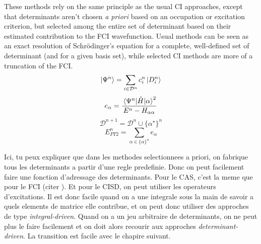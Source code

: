 \documentclass[./thesis.tex]{subfiles}
\begin{document}
These methods rely on the same principle as the usual CI approaches, except that determinants aren't chosen \textit{a priori} based on an occupation or excitation criterion, but selected among the entire set of determinant based on their estimated contribution to the FCI wavefunction. Usual methods can be seen as an exact resolution of Schrödinger's equation for a complete, well-defined set of determinant (and for a given basis set), while selected CI methods are more of a truncation of the FCI.
\begin{equation}
\ket{\Psi^{n}} = \sum_{i \in \mathcal{D}^n} c_i^{n} \ket{D^n_i}
\end{equation}
\begin{equation}
e_\alpha = \frac{\mel{\Psi^n}{\hat{H}}{\alpha}^2}{E^n - H_{\alpha \alpha}}
\end{equation}
\begin{equation}
\mathcal{D}^{n+1} = \mathcal{D}^{n} \cup \{ \alpha^\star \}^n
\end{equation}
\begin{equation}
E_{PT2}^n = \sum_{\alpha \in \{\alpha \}^n} e_\alpha
\end{equation}

\alert{Ici, tu peux expliquer que dans les methodes selectionnees a priori, on
fabrique tous les determinants a partir d'une regle predefinie. Donc on peut
facilement faire une fonction d'adressage des determinants. Pour le CAS, c'est
la meme que pour le FCI (citer \cite{Knowles_1984}). Et pour le CISD, on peut
utiliser les operateurs d'excitations. Il est donc facile quand on a une
integrale sous la main de savoir a quels elements de matrice elle contribue, et
on peut donc utiliser des approches de type \emph{integral-driven}. Quand on a
un jeu arbitraire de determinants, on ne peut plus le faire facilement et on
doit alors recourir aux approches \emph{determinant-driven}. La transition est
facile avec le chapire suivant.}
\end{document}
